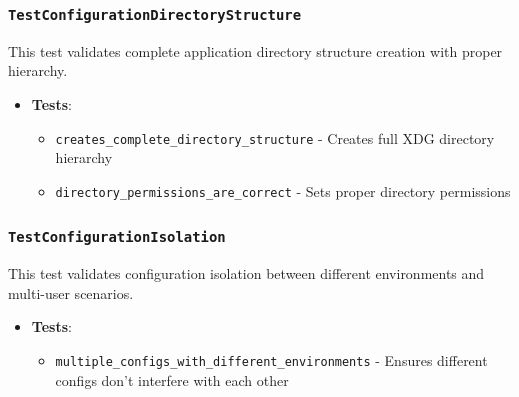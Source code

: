 \subsubsection*{\texttt{TestConfigurationDirectoryStructure}}
This test validates complete application directory structure creation with proper hierarchy.
\begin{itemize}
    \item \textbf{Tests}:
    \begin{itemize}
        \item \texttt{creates\_complete\_directory\_structure} - Creates full XDG directory hierarchy
        \item \texttt{directory\_permissions\_are\_correct} - Sets proper directory permissions
    \end{itemize}
\end{itemize}

\subsubsection*{\texttt{TestConfigurationIsolation}}
This test validates configuration isolation between different environments and multi-user scenarios.
\begin{itemize}
    \item \textbf{Tests}:
    \begin{itemize}
        \item \texttt{multiple\_configs\_with\_different\_environments} - Ensures different configs don't interfere with each other
    \end{itemize}
\end{itemize}

